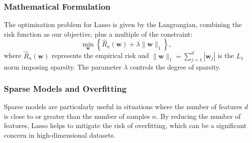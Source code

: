 \subsubsection*{Mathematical Formulation}
The optimisation problem for Lasso is given by the Langrangian, combining the risk function as our objective, plus a multiple of the constraint:
\begin{equation}
\min_{\mathbf{w}} \left\{ \hat{R}_n(\mathbf{w}) + \lambda \|\mathbf{w}\|_1 \right\},
\end{equation}
where \( \hat{R}_n(\mathbf{w}) \) represents the empirical risk and \( \|\mathbf{w}\|_1 = \sum_{j=1}^{d} |\mathbf{w}_j| \) is the \( L_1 \) norm imposing sparsity. The parameter \( \lambda \) controls the degree of sparsity.





\subsubsection*{Sparse Models and Overfitting}
Sparse models are particularly useful in situations where the number of features \( d \) is close to or greater than the number of samples \( n \). By reducing the number of features, Lasso helps to mitigate the risk of overfitting, which can be a significant concern in high-dimensional datasets.


